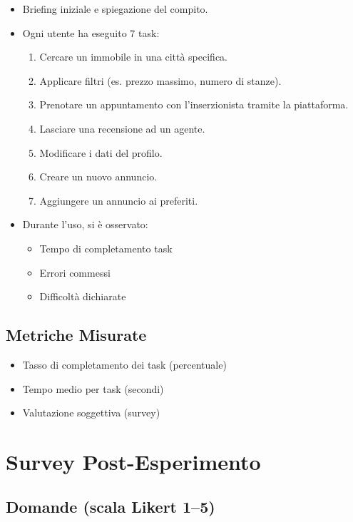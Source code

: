 \begin{itemize}
  \item Briefing iniziale e spiegazione del compito.
  \item Ogni utente ha eseguito 7 task:
  \begin{enumerate}
    \item Cercare un immobile in una città specifica.
    \item Applicare filtri (es. prezzo massimo, numero di stanze).
    \item Prenotare un appuntamento con l’inserzionista tramite la piattaforma.
    \item Lasciare una recensione ad un agente.
    \item Modificare i dati del profilo.
    \item Creare un nuovo annuncio.
    \item Aggiungere un annuncio ai preferiti.
  \end{enumerate}
  \item Durante l’uso, si è osservato:
  \begin{itemize}
    \item Tempo di completamento task
    \item Errori commessi
    \item Difficoltà dichiarate
  \end{itemize}
\end{itemize}

\subsection{Metriche Misurate}
\begin{itemize}
  \item Tasso di completamento dei task (percentuale)
  \item Tempo medio per task (secondi)
  \item Valutazione soggettiva (survey)
\end{itemize}

\section{Survey Post-Esperimento}

\subsection{Domande (scala Likert 1–5)}

